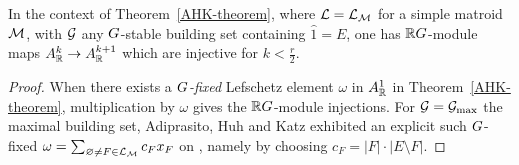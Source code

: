\begin{cor}
\label{AHK-equivariant-Hard-Lefschetz}
In the context of Theorem~\ref{AHK-theorem}, where $\mathcal{L}=\mathcal{L}_{\mathcal{M}}$ for a simple matroid $\mathcal{M}$, with $\mathcal{G}$ any $G$-stable building set containing $\hat{1}=E$, one has $\mathbb{R} G$-module maps
    $A^k_{\mathbb{R}} \rightarrow A_{\mathbb{R}}^{k+1}$ which are
    injective for $k < \frac{r}{2}$.
\end{cor}
\begin{proof}
When there exists a
{\it $G$-fixed} Lefschetz element
$\omega$ in $A^1_{\mathbb{R}}$ in Theorem~\ref{AHK-theorem}, 
multiplication by $\omega$ gives the $\mathbb{R} G$-module injections.  For $\mathcal{G}=\mathcal{G}_{\max}$ the maximal building set,
Adiprasito, Huh and Katz \cite{AHK} exhibited an explicit such $G$-fixed $\omega=\sum_{\varnothing \neq F \in \mathcal{L}_{\mathcal{M}}} c_F x_F$
on \cite[p. 384]{AHK}, namely
by choosing $c_F=|F| \cdot |E \setminus F|$. 


\end{proof}
